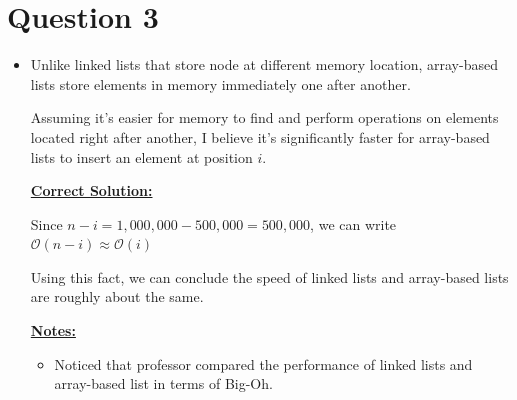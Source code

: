 \documentclass[12pt]{article}
\begin{document}
\section*{Question 3}
\begin{itemize}
    \item

    Unlike linked lists that store node at different memory location, array-based
    lists store elements in memory immediately one after another.

    \bigskip

    Assuming it's easier for memory to find and perform operations on elements
    located right after another, I believe it's significantly faster for
    array-based lists to insert an element at position $i$.

    \bigskip

    \begin{mdframed}
        \underline{\textbf{Correct Solution:}}

        \bigskip

        \color{red}
        Since $n - i = 1,000,000 - 500,000 = 500,000$, we can write
        $\mathcal{O}(n-i) \approx \mathcal{O}(i)$

        \bigskip

        Using this fact, we can conclude the speed of linked lists and array-based
        lists are roughly about the same.
        \color{black}
    \end{mdframed}

    \bigskip

    \underline{\textbf{Notes:}}

    \bigskip

    \begin{itemize}
        \item Noticed that professor compared the performance of linked lists
        and array-based list in terms of Big-Oh.
    \end{itemize}

\end{itemize}
\end{document}
